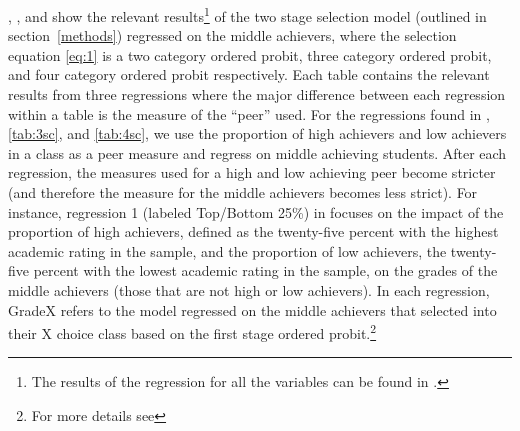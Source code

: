 , , and  show the relevant results\footnote{The results of the regression for all the variables can be found in .} of the two stage selection model (outlined in section~\ref{methods}) regressed on the middle achievers, where the selection equation \eqref{eq:1} is a two category ordered probit, three category ordered probit, and four category ordered probit respectively. 
Each table contains the relevant results from three regressions where the major difference between each regression within a table is the measure of the ``peer'' used. 
For the regressions found in , \ref{tab:3sc}, and \ref{tab:4sc}, we use the proportion of high achievers and low achievers in a class as a peer measure and regress on middle achieving students. 
After each regression, the measures used for a high and low achieving peer become stricter (and therefore the measure for the middle achievers becomes less strict). 
For instance, regression 1 (labeled Top/Bottom 25\%) in  focuses on the impact of the proportion of high achievers, defined as the twenty-five percent with the highest academic rating in the sample, and the proportion of low achievers, the twenty-five percent with the lowest academic rating in the sample, on the grades of the middle achievers (those that are not high or low achievers). 
In each regression, GradeX refers to the model regressed on the middle achievers that selected into their X choice class based on the first stage ordered probit.\footnote{For more details see } 

